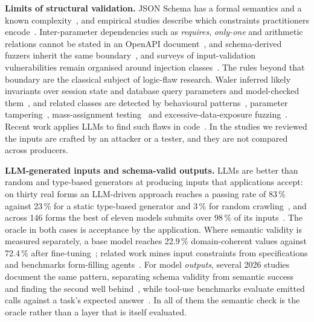 \documentclass[journal]{IEEEtran}
\begin{document}
\textbf{Limits of structural validation.} JSON Schema has a formal semantics and a known
complexity~\cite{pezoa2016foundations,attouche2023jsonschema}, and empirical studies describe which
constraints practitioners encode~\cite{baazizi2021usagenot}. Inter-parameter dependencies such as
\emph{requires}, \emph{only-one} and arithmetic relations cannot be stated in an OpenAPI
document~\cite{martinlopez2022idl,martinlopez2019catalogue}, and schema-derived fuzzers inherit the
same boundary~\cite{hatfielddodds2021schemathesis}, and surveys of input-validation vulnerabilities
remain organised around injection classes~\cite{fadlalla2023inputvalidation}. The rules beyond that
boundary are the classical subject of logic-flaw research. Waler inferred likely invariants over
session state and database query parameters and model-checked them~\cite{felmetsger2010waler}, and
related classes are detected by behavioural patterns~\cite{pellegrino2014logicflaws}, parameter
tampering~\cite{bisht2010notamper}, mass-assignment testing~\cite{corradini2023massassignment} and
excessive-data-exposure fuzzing~\cite{pan2024edefuzz}. Recent work applies LLMs to find such flaws in code~\cite{metin2025blv}. In the studies we reviewed the
inputs are crafted by an attacker or a tester, and they are not compared across producers.

\textbf{LLM-generated inputs and schema-valid outputs.} LLMs are better than random and type-based generators at producing inputs that applications accept:
on thirty real forms an LLM-driven approach reaches a passing rate of 83\,\% against 23\,\% for a
static type-based generator and 3\,\% for random crawling~\cite{alian2024formnexus}, and across 146
forms the best of eleven models submits over 98\,\% of its inputs~\cite{li2026webformtest}. The oracle
in both cases is acceptance by the application. Where semantic validity is measured separately, a base
model reaches 22.9\,\% domain-coherent values against 72.4\,\% after
fine-tuning~\cite{kim2025llamaresttest}; related work mines input constraints from specifications and
benchmarks form-filling agents~\cite{li2025formfactory}. For model \emph{outputs}, several 2026
studies document the same pattern, separating schema validity from semantic success and finding the
second well
behind~\cite{li2026orderbench,ray2026constrainttax,singh2026sob,sigdel2026schemafirst,wrenn2026enterprise},
while tool-use benchmarks evaluate emitted calls against a task's expected
answer~\cite{yu2026wildtoolbench,yu2026parambench}. In all of them the semantic check is the oracle
rather than a layer that is itself evaluated.
\end{document}
